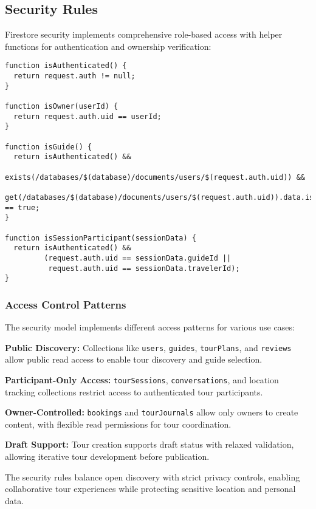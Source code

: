 \documentclass[12pt,a4paper]{article}
\begin{document}
\subsection{Security Rules}

Firestore security implements comprehensive role-based access with helper functions for authentication and ownership verification:

\begin{lstlisting}[caption=Core Security Functions]
function isAuthenticated() {
  return request.auth != null;
}

function isOwner(userId) {
  return request.auth.uid == userId;
}

function isGuide() {
  return isAuthenticated() && 
         exists(/databases/$(database)/documents/users/$(request.auth.uid)) &&
         get(/databases/$(database)/documents/users/$(request.auth.uid)).data.isGuide == true;
}

function isSessionParticipant(sessionData) {
  return isAuthenticated() && 
         (request.auth.uid == sessionData.guideId || 
          request.auth.uid == sessionData.travelerId);
}
\end{lstlisting}

\subsubsection{Access Control Patterns}

The security model implements different access patterns for various use cases:

\textbf{Public Discovery:} Collections like \texttt{users}, \texttt{guides}, \texttt{tourPlans}, and \texttt{reviews} allow public read access to enable tour discovery and guide selection.

\textbf{Participant-Only Access:} \texttt{tourSessions}, \texttt{conversations}, and location tracking collections restrict access to authenticated tour participants.

\textbf{Owner-Controlled:} \texttt{bookings} and \texttt{tourJournals} allow only owners to create content, with flexible read permissions for tour coordination.

\textbf{Draft Support:} Tour creation supports draft status with relaxed validation, allowing iterative tour development before publication.

The security rules balance open discovery with strict privacy controls, enabling collaborative tour experiences while protecting sensitive location and personal data.
\end{document}
